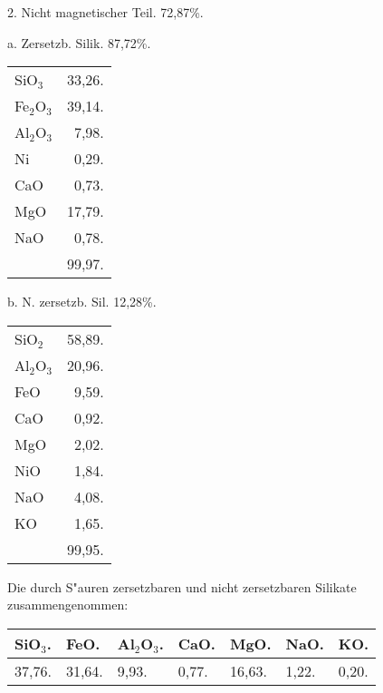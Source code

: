\documentclass[a4paper, 11pt, oneside]{article}
\begin{document}
\begin{center}
2. Nicht magnetischer Teil. 72,87\%.
\end{center}

\begin{center}
a. Zersetzb. Silik. 87,72\%.
\end{center}

\begin{table}[H]
    \centering\swabfamily\Large
    \begin{tabular}{l r}
        SiO$_{3}$ & 33,26. \\
        Fe$_{2}$O$_{3}$ & 39,14. \\
        Al$_{2}$O$_{3}$ & 7,98. \\
        Ni & 0,29. \\
        CaO & 0,73. \\
        MgO & 17,79. \\
        NaO & 0,78. \\
         & 99,97. \\
    \end{tabular}
\end{table}

\begin{center}
b. N. zersetzb. Sil. 12,28\%.  
\end{center}

\begin{table}[H]
    \centering\swabfamily\Large
    \begin{tabular}{l r}
        SiO$_{2}$ & 58,89. \\
        Al$_{2}$O$_{3}$ & 20,96. \\
        FeO & 9,59. \\
        CaO & 0,92. \\
        MgO & 2,02. \\
        NiO & 1,84. \\
        NaO & 4,08. \\
        KO & 1,65. \\
         & 99,95. \\
    \end{tabular}
\end{table}

Die durch S"auren zersetzbaren und nicht zersetzbaren Silikate zusammengenommen:
\begin{table}[H]
    \centering\swabfamily\Large
    \begin{tabular}{l l l l l l l}
        SiO$_{3}$. & FeO. & Al$_{2}$O$_{3}$. & CaO. & MgO. & NaO. & KO. \\ \hline
        37,76. & 31,64. & 9,93. & 0,77. & 16,63. & 1,22. & 0,20. \\
    \end{tabular}
\end{table}
\end{document}
